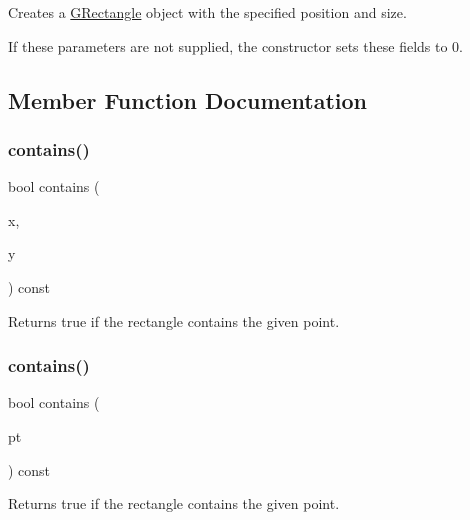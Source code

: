 Creates a {\ttfamily \mbox{\hyperlink{structsgl_1_1GRectangle}{G\+Rectangle}}} object with the specified position and size. 

If these parameters are not supplied, the constructor sets these fields to 0. 

\subsection{Member Function Documentation}
\mbox{\label{structsgl_1_1GRectangle_abb6a5d7c03e6eaaae97264c4799ce7c3}} 
\subsubsection{\texorpdfstring{contains()}{contains()}\hspace{0.1cm}{\footnotesize\ttfamily [1/3]}}
{\footnotesize\ttfamily bool contains (\begin{DoxyParamCaption}\item[{double}]{x,  }\item[{double}]{y }\end{DoxyParamCaption}) const}



Returns {\ttfamily true} if the rectangle contains the given point. 

\mbox{\label{structsgl_1_1GRectangle_a1dbc9dafaae51958112dbe1267a1f547}} 
\subsubsection{\texorpdfstring{contains()}{contains()}\hspace{0.1cm}{\footnotesize\ttfamily [2/3]}}
{\footnotesize\ttfamily bool contains (\begin{DoxyParamCaption}\item[{const \mbox{\hyperlink{structsgl_1_1GPoint}{G\+Point}} \&}]{pt }\end{DoxyParamCaption}) const}



Returns {\ttfamily true} if the rectangle contains the given point. 

